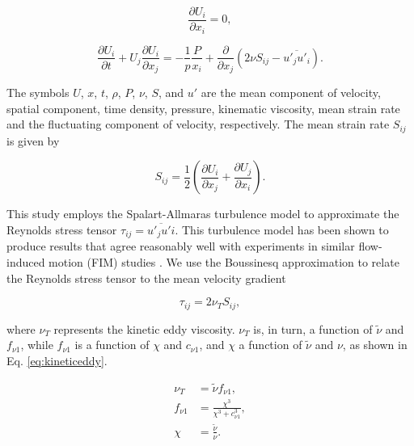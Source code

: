 \documentclass[a4paper,fleqn]{cas-sc}
\begin{document}
\begin{equation}
  \frac{\partial U_{i}}{\partial x_{i}}=0,
  \label{eq:continuity}
\end{equation}

\begin{equation}
  \frac{\partial U_{i}}{\partial t}+U_{j}\frac{\partial U_{i}}{\partial x_{j}} = -\frac{1}{p}\frac{P}{x_{i}}+\frac{\partial}{\partial x_{j}} \left( 2\nu S_{ij}-\overline{u'_{j}u'_{i}} \right).
  \label{eq:navier-stokes}
\end{equation}

The symbols $U$, $x$, $t$, $\rho$, $P$, $\nu$, $S$, and $u'$ are the mean component of velocity, spatial component, time density, pressure, kinematic viscosity, mean strain rate and the fluctuating component of velocity, respectively. The mean strain rate $S_{ij}$ is given by

\begin{equation}
  S_{ij} = \frac{1}{2} \left( \frac{\partial U_{i}}{\partial x_{j}} + \frac{\partial U_{j}}{\partial x_{i}} \right).
  \label{eq:sij}
\end{equation}

This study employs the Spalart-Allmaras turbulence model to approximate the Reynolds stress tensor $\tau_{ij} = \overline{u'_{j}u'{i}}$. This turbulence model has been shown to produce results that agree reasonably well with experiments in similar flow-induced motion (FIM) studies \citep{Ding2015a,Ding2015b}. We use the Boussinesq approximation to relate the Reynolds stress tensor to the mean velocity gradient

\begin{equation}
  \tau_{ij} = 2 \nu_{T}S_{ij},
  \label{eq:tauij}
\end{equation}

\noindent where $\nu_{T}$ represents the kinetic eddy viscosity. $\nu_{T}$ is, in turn, a function of $\tilde{\nu}$ and $f_{\nu 1}$, while $f_{\nu 1}$ is a function of $\chi$ and $c_{\nu 1}$, and $\chi$ a function of $\tilde{\nu}$ and $\nu$, as shown in Eq. \ref{eq:kineticeddy}.

\begin{subequations}
  \label{eq:kineticeddy}
  \begin{align}
    \nu_{T}   & = \tilde{\nu} f_{\nu 1}, \label{eq:kineticeddyA}\\
    f_{\nu 1} & = \frac{\chi^{3}}{\chi^{3}+c^{3}_{\nu 1}}, \label{eq:kineticeddyB}\\
    \chi      & = \frac{\tilde{\nu}}{\nu}. \label{eq:kineticeddyC}
\end{align}
\end{subequations}
\end{document}
